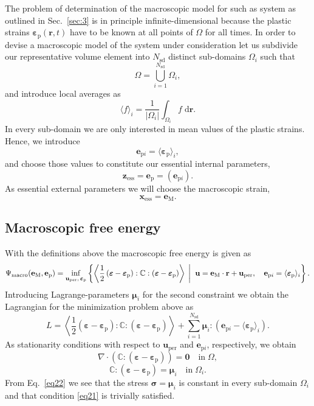 \documentclass[final,1p,times]{elsarticle}
\newcommand{\beps}{\boldsymbol{\varepsilon}}
\newcommand{\bfmu}{\boldsymbol{\mu}}
\newcommand{\bfsigma}{\boldsymbol{\sigma}}
\newcommand{\bepsp}{\boldsymbol{\varepsilon}_\mathrm{p}}
\newcommand{\be}{\begin{equation}}
\newcommand{\ee}{\end{equation}}
\newcommand{\bfm}[1]{ \mathbf{#1} }
\def\dd{\;\!\mathrm{d}}
\renewcommand{\inf}[3]{
\underset{#1}{\mathrm{inf}}\left\lbrace #2 \; \left| \vphantom{#2}\vphantom{#3} \right. \; #3 \right\rbrace
}
\begin{document}
The problem of determination of the macroscopic model for such as system as outlined in Sec.\ \ref{sec:3} is in principle infinite-dimensional because the plastic strains $\bepsp(\bfm{r},t)$ have to be known at all points of $\Omega$ for all times. In order to devise a macroscopic model of the system under consideration let us subdivide our representative volume element into $N_\mathrm{sd}$ distinct sub-domains $\Omega_i$ such that
\be
\label{eq15}
\Omega = \bigcup_{i=1}^{N_\mathrm{sd}} \Omega_i,
\ee
and introduce local averages as 
\be
\label{eq15a}
\langle f \rangle_i =  \frac{1}{|\Omega_i|} \int_{\Omega_i} f \dd\bfm{r}.
\ee
In every sub-domain we are only interested in mean values of the plastic strains.
Hence, we introduce
\be
\label{eq16}
\bfm{e}_{\mathrm{p}i} =  \langle \bepsp \rangle_i,
\ee
and choose those values to constitute our essential internal parameters,
\be
\label{eq16a} 
\bfm{z}_\mathrm{ess} = \bfm{e}_{\mathrm{p}} = \left( \bfm{e}_{\mathrm{p}i}  \right). 
\ee
As essential external parameters we will choose the macroscopic strain,
\be
\label{eq17}
\bfm{x}_\mathrm{ess} = \bfm{e}_\mathrm{M}.
\ee

\subsection{Macroscopic free energy}

With the definitions above the macroscopic free energy is given as
\be
\label{eq18}
\Psi_\mathrm{macro}(\bfm{e}_\mathrm{M},\bfm{e}_{\mathrm{p}} ) =
\inf{\bfm{u}_\mathrm{per},\, \bepsp}{\left\langle \frac{1}{2} \left( \beps - \bepsp \right) : \mathbb{C} : \left( \beps - \bepsp \right) \right\rangle}
{\bfm{u} = \bfm{e}_\mathrm{M}\cdot \bfm{r} + \bfm{u}_\mathrm{per}, \quad \bfm{e}_{\mathrm{p}i} =  \langle \bepsp \rangle_i }.
\ee
Introducing Lagrange-parameters $\bfmu_{i}$ for the second constraint we obtain the Lagrangian for the minimization problem above as
\be
\label{eq20}
L =
\left\langle \frac{1}{2} \left( \beps - \bepsp \right) : \mathbb{C} : \left( \beps - \bepsp \right) \right\rangle + \sum_{i=1}^{N_\mathrm{sd}} \bfmu_{i} : \left( \bfm{e}_{\mathrm{p}i} - \langle \bepsp \rangle_i \right).
\ee
As stationarity conditions with respect to $\bfm{u}_\mathrm{per}$ and $\bfm{e}_{\mathrm{p}i}$, respectively, we obtain
\be
\label{eq21}
\nabla\cdot \left( \mathbb{C} : \left( \beps - \bepsp \right) \right) =\mathbf{0} \quad \mbox{in} \; \Omega,
\ee
\be
\label{eq22}
\mathbb{C} : \left( \beps - \bepsp \right) = \bfmu_{i} \quad \mbox{in} \; \Omega_i.
\ee
From Eq.\  \eqref{eq22} we see that the stress $\bfsigma=\bfmu_i$ is constant in every sub-domain $\Omega_i$ and that condition \eqref{eq21} is trivially satisfied. 
\end{document}
